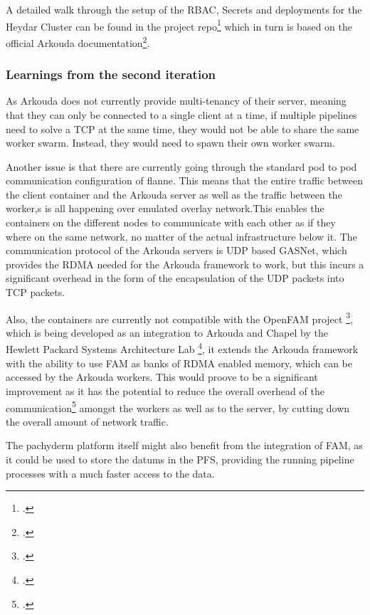 A detailed walk through the setup of the \ac{RBAC}, Secrets and deployments for the Heydar Cluster can be found in the project repo\footcite{eckerthProjectRepoHeydar} which in turn is based on the official
Arkouda documentation\footcite{ArkoudacontribArkoudadockerMain}.

\subsubsection*{Learnings from the second iteration}
As Arkouda does not currently provide multi-tenancy of their server, meaning that they can only be connected to a single client at a time, 
if multiple pipelines need to solve a \ac{TCP} at the same time, they would not be able to share the same worker swarm.
Instead, they would need to spawn their own worker swarm.

Another issue is that there are currently going through the standard pod to pod communication configuration of flanne. 
This means that the entire traffic between the client container and the Arkouda server 
as well as the traffic between the worker,s is all happening over emulated overlay network.This enables the containers on the different nodes to communicate with each other as if they where on the same network, no matter of the actual infrastructure below it.
The communication protocol of the Arkouda servers is \ac{UDP} based \ac{GASNet}, which provides the \ac{RDMA} needed for the Arkouda framework to work, but this incurs a significant overhead in the form of the encapsulation of the \ac{UDP} packets into \ac{TCP} packets.

Also, the containers are currently not compatible with the OpenFAM project \footcite{keetonOpenFAMAPIProgramming2019}, which is being developed as an integration to Arkouda and Chapel by the Hewlett Packard Systems Architecture Lab \footcite{byrneCouplingChapelPoweredHPC2023},
it extends the Arkouda framework with the ability to use \ac{FAM} as banks of \ac{RDMA} enabled memory, which can be accessed by the Arkouda workers.
This would proove to be a significant improvement as it has the potential to reduce the overall overhead of the communication\Footcite{chouOptimizingPostCopyLive2019} amongst the workers as well as to the server, by cutting down the overall amount of network traffic.

The pachyderm platform itself might also benefit from the integration of \ac{FAM}, as it could be used to store the datums in the \ac{PFS}, providing the running pipeline processes with a much faster access to the data.

